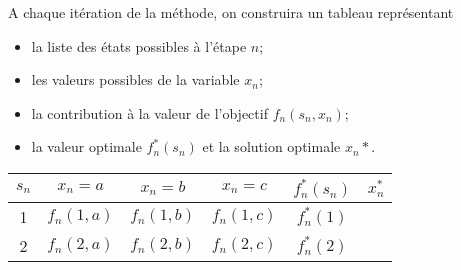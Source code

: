 A chaque itération de la méthode, on construira un tableau représentant
\begin{itemize}
\item
la liste des états possibles à l’étape $n$;
\item
les valeurs possibles de la variable $x_n$;
\item
la contribution à la valeur de l’objectif $f_n(s_n,x_n)$;
\item
la valeur optimale $f^*_n(s_n)$ et la solution optimale $x_n*$.
\end{itemize}

\begin{tabular}{|c|c|c|c|c|c|}
\hline
$s_n$ & $x_n = a$ & $x_n = b$ & $x_n = c$ & $f_n^*(s_n)$ & $x_n^*$ \\
\hline
1 & $f_n(1,a)$ & $f_n(1,b)$ & $f_n(1,c)$ & $f_n^*(1)$ & \\
\hline
2 & $f_n(2,a)$ & $f_n(2,b)$ & $f_n(2,c)$ & $f_n^*(2)$ & \\
\hline
\end{tabular}

